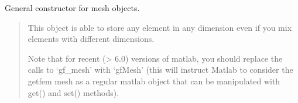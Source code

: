 \documentclass[a4paper,11pt,english]{sphinxmanual}
\begin{document}
\begin{sphinxVerbatim}[commandchars=\\\{\}]
      
    
    
      
    
      \PYG{p}{[}    \PYG{p}{[}  \PYG{p}{]}\PYG{p}{]}
\end{sphinxVerbatim}

\sphinxAtStartPar
{}

\sphinxAtStartPar
General constructor for mesh objects.
\begin{quote}

\sphinxAtStartPar
This object is able to store any element in any dimension even if you mix
elements with different dimensions.

\sphinxAtStartPar
Note that for recent (\textgreater{} 6.0) versions of matlab, you should
replace the calls to ‘gf\_mesh’ with ‘gfMesh’ (this will instruct Matlab to
consider the getfem mesh as a regular matlab object that can be
manipulated with get() and set() methods).
\end{quote}
\end{document}
